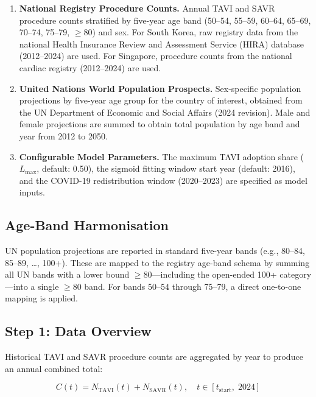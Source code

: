 \documentclass[12pt, a4paper]{article}
\begin{document}
\begin{enumerate}[leftmargin=*, itemsep=4pt]
    \item \textbf{National Registry Procedure Counts.} Annual TAVI and SAVR procedure counts stratified by five-year age band (50--54, 55--59, 60--64, 65--69, 70--74, 75--79, $\geq$80) and sex. For South Korea, raw registry data from the national Health Insurance Review and Assessment Service (HIRA) database (2012--2024) are used. For Singapore, procedure counts from the national cardiac registry (2012--2024) are used.

    \item \textbf{United Nations World Population Prospects.} Sex-specific population projections by five-year age group for the country of interest, obtained from the UN Department of Economic and Social Affairs (2024 revision). Male and female projections are summed to obtain total population by age band and year from 2012 to 2050.

    \item \textbf{Configurable Model Parameters.} The maximum TAVI adoption share ($L_{\max}$, default: 0.50), the sigmoid fitting window start year (default: 2016), and the COVID-19 redistribution window (2020--2023) are specified as model inputs.
\end{enumerate}

\subsection{Age-Band Harmonisation}

UN population projections are reported in standard five-year bands (e.g., 80--84, 85--89, \ldots, 100+). These are mapped to the registry age-band schema by summing all UN bands with a lower bound $\geq$80---including the open-ended 100+ category---into a single $\geq$80 band. For bands 50--54 through 75--79, a direct one-to-one mapping is applied.

\subsection{Step 1: Data Overview}

Historical TAVI and SAVR procedure counts are aggregated by year to produce an annual combined total:

\begin{equation}
    C(t) = N_{\mathrm{TAVI}}(t) + N_{\mathrm{SAVR}}(t), \quad t \in [t_{\mathrm{start}}, \; 2024]
\end{equation}
\end{document}
